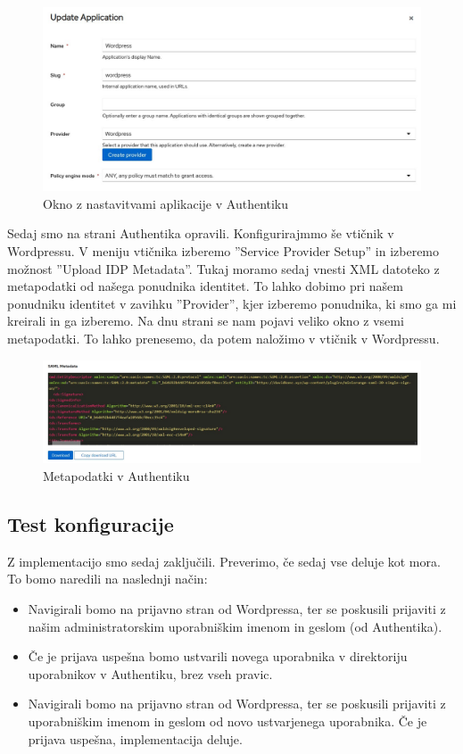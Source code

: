 \documentclass[a4paper,12pt,openright]{book}
\begin{document}
{\begin{figure}[H]
\hspace{-2cm}
\includegraphics[scale=0.65]{diploma-FRI-vzorec_11maj2021/AuthAplication.jpg}
\caption{Okno z nastavitvami aplikacije v Authentiku}
\label{fig}
\end{figure}

Sedaj smo na strani Authentika opravili. Konfigurirajmmo še vtičnik v Wordpressu. V meniju vtičnika izberemo ''Service Provider Setup'' in izberemo možnost ''Upload IDP Metadata''. Tukaj moramo sedaj vnesti XML datoteko z metapodatki od našega ponudnika identitet. To lahko dobimo pri našem ponudniku identitet v zavihku ''Provider'', kjer izberemo ponudnika, ki smo ga mi kreirali in ga izberemo. Na dnu strani se nam pojavi veliko okno z vsemi metapodatki. To lahko prenesemo, da potem naložimo v vtičnik v Wordpressu. 

\begin{figure}[H]
\hspace{-4cm}
\includegraphics[scale=0.5]{diploma-FRI-vzorec_11maj2021/SAMLMetadata.jpg}
\caption{Metapodatki v Authentiku}
\label{fig}
\end{figure}

\subsection{Test konfiguracije}

Z implementacijo smo sedaj zaključili. Preverimo, če sedaj vse deluje kot mora. 
To bomo naredili na naslednji način:
\begin{itemize}
    \item Navigirali bomo na prijavno stran od Wordpressa, ter se poskusili prijaviti z našim administratorskim uporabniškim imenom in geslom (od Authentika). 
    \item Če je prijava uspešna bomo ustvarili novega uporabnika v direktoriju uporabnikov v Authentiku, brez vseh pravic. 
    \item Navigirali bomo na prijavno stran od Wordpressa, ter se poskusili prijaviti z uporabniškim imenom in geslom od novo ustvarjenega uporabnika. Če je prijava uspešna, implementacija deluje. 
\end{itemize}

}
\end{document}
